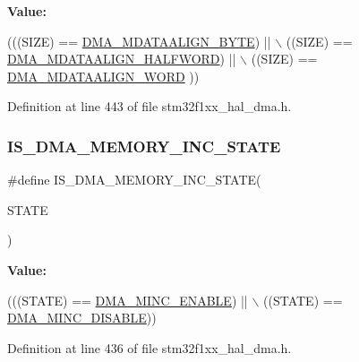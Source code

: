 {\bfseries Value\+:}
\begin{DoxyCode}
(((SIZE) == \hyperlink{group___d_m_a___memory__data__size_ga9ed07bddf736298eba11508382ea4d51}{DMA\_MDATAALIGN\_BYTE})     || \(\backslash\)
                                       ((SIZE) == \hyperlink{group___d_m_a___memory__data__size_ga2c7355971c0da34a7ffe50ec87403071}{DMA\_MDATAALIGN\_HALFWORD}) || \(\backslash\)
                                       ((SIZE) == \hyperlink{group___d_m_a___memory__data__size_ga8812da819f18c873249074f3920220b2}{DMA\_MDATAALIGN\_WORD} ))
\end{DoxyCode}


Definition at line 443 of file stm32f1xx\+\_\+hal\+\_\+dma.\+h.

\mbox{\label{group___d_m_a___private___macros_gaa880f39d499d1e80449cf80381e4eb67}} 
\subsubsection{\texorpdfstring{I\+S\+\_\+\+D\+M\+A\+\_\+\+M\+E\+M\+O\+R\+Y\+\_\+\+I\+N\+C\+\_\+\+S\+T\+A\+TE}{IS\_DMA\_MEMORY\_INC\_STATE}}
{\footnotesize\ttfamily \#define I\+S\+\_\+\+D\+M\+A\+\_\+\+M\+E\+M\+O\+R\+Y\+\_\+\+I\+N\+C\+\_\+\+S\+T\+A\+TE(\begin{DoxyParamCaption}\item[{}]{S\+T\+A\+TE }\end{DoxyParamCaption})}

{\bfseries Value\+:}
\begin{DoxyCode}
(((STATE) == \hyperlink{group___d_m_a___memory__incremented__mode_ga43d30885699cc8378562316ff4fed1cd}{DMA\_MINC\_ENABLE})  || \(\backslash\)
                                        ((STATE) == \hyperlink{group___d_m_a___memory__incremented__mode_ga32625330516c188151743473fad97a33}{DMA\_MINC\_DISABLE}))
\end{DoxyCode}


Definition at line 436 of file stm32f1xx\+\_\+hal\+\_\+dma.\+h.

\mbox{\label{group___d_m_a___private___macros_gad88ee5030574d6a573904378fb62c7ac}} 
